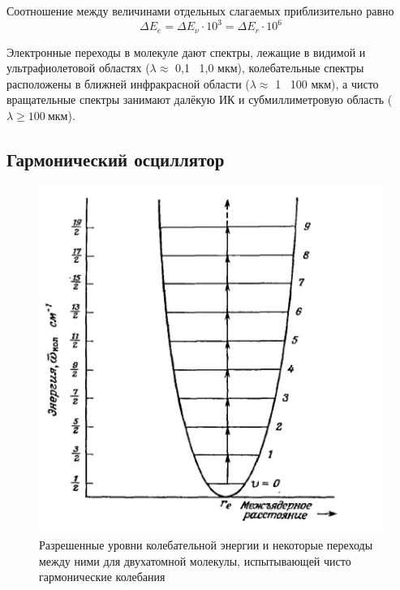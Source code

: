 \documentclass{article}
\begin{document}
Соотношение между величинами отдельных слагаемых приблизительно равно 
\begin{equation} 
\label{sootnoshenie}
\Delta E_{e}  = \Delta E_{\nu}\cdot 10^3 = \Delta E_{r}\cdot 10^6  \end{equation}

 Электронные переходы в молекуле дают спектры, лежащие в видимой и ультрафиолетовой областях ($\lambda \approx$ 0,1 \textdiv ~1,0 мкм), колебательные спектры расположены в ближней инфракрасной области ($\lambda \approx$ 1 \textdiv ~100 мкм), а чисто вращательные спектры занимают далёкую ИК и субмиллиметровую область ($\lambda \geqslant 100~ мкм$).
 \subsection*{Гармонический осциллятор}
 \begin{figure}[h]
\begin{center}
\begin{minipage}[h]{0.4\linewidth}
\includegraphics[width=1\linewidth]{Screenshot 2024-02-17 at 3.53.50 PM.png}
\caption{Разрешенные уровни колебательной энергии и некоторые переходы между ними для двухатомной молекулы, испытывающей чисто гармонические колебания}
\label{garm}
\end{minipage}
\hfill 
\begin{minipage}[h]{0.4\linewidth}

\end{minipage}
\end{center}
\end{figure}
\end{document}

